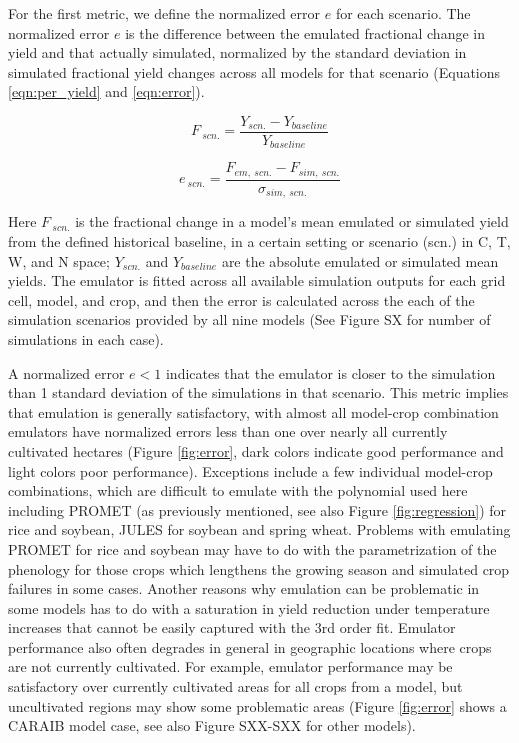 \documentclass[gmd, manuscript]{copernicus} %
\begin{document}
For the first metric, we define the normalized error $e$ for each scenario. The normalized error $e$ is the difference between the emulated fractional change in yield and that actually simulated, normalized by the standard deviation in simulated fractional yield changes across all models for that scenario (Equations \ref{eqn:per_yield} and  \ref{eqn:error}). 

\begin{equation}
    \label{eqn:per_yield}
    F_{\: scn.}= \frac{Y_{scn.}-Y_{baseline}}{Y_{baseline}}
\end{equation}

\begin{equation}
    \label{eqn:error}
    e_{\: scn.} = \frac{F_{em, \: scn.}-F_{sim, \: scn.}}{\sigma_{sim, \: scn.}}
\end{equation}

Here $F_{\: scn.}$ is the fractional change in a model's mean emulated or simulated yield from the defined historical baseline, in a certain setting or scenario (scn.) in C, T, W, and N space; $Y_{scn.}$ and $Y_{baseline}$ are the absolute emulated or simulated mean yields. 
The emulator is fitted across all available simulation outputs for each grid cell, model, and crop, and then the error is calculated across the each of the simulation scenarios provided by all nine models (See Figure SX for number of simulations in each case). 

A normalized error $e<1$ indicates that the emulator is closer to the simulation than 1 standard deviation of the simulations in that scenario.
This metric implies that emulation is generally satisfactory, with almost all model-crop combination emulators have normalized errors less than one over nearly all currently cultivated hectares (Figure \ref{fig:error}, dark colors indicate good performance and light colors poor performance). 
Exceptions include a few individual model-crop combinations, which are difficult to emulate with the polynomial used here including PROMET (as previously mentioned, see also Figure \ref{fig:regression}) for rice and soybean, JULES for soybean and spring wheat. 
Problems with emulating PROMET for rice and soybean may have to do with the parametrization of the phenology for those crops which lengthens the growing season and simulated crop failures in some cases. 
Another reasons why emulation can be problematic in some models has to do with a saturation in yield reduction under temperature increases that cannot be easily captured with the 3rd order fit.
Emulator performance also often degrades in general in geographic locations where crops are not currently cultivated. 
For example, emulator performance may be satisfactory over currently cultivated areas for all crops from a model, but uncultivated regions may show some problematic areas (Figure \ref{fig:error} shows a CARAIB model case, see also Figure SXX-SXX for other models).
\end{document}
